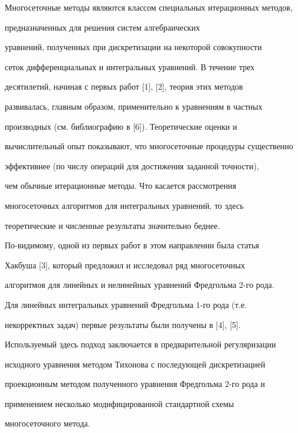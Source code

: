 \maketitle





Многосеточные методы являются классом специальных итерационных методов,


предназначенных для решения систем алгебраических


уравнений, полученных при дискретизации на некоторой совокупности


сеток дифференциальных и интегральных уравнений. В течение трех


десятилетий, начиная с первых работ [1], [2], теория этих методов


развивалась, главным образом, применительно к уравнениям в частных


производных (см. библиографию в [6]). Теоретические оценки и


вычислительный опыт показывают, что многосеточные процедуры существенно


эффективнее (по числу операций для достижения заданной точности),


чем обычные итерационные методы. Что касается рассмотрения


многосеточных алгоритмов для интегральных уравнений, то здесь


теоретические и численные результаты значительно беднее.


По-видимому, одной из первых работ в этом направлении была статья


Хакбуша [3], который предложил и исследовал ряд многосеточных


алгоритмов для линейных и нелинейных уравнений Фредгольма 2-го рода.


Для линейных интегральных уравнений Фредгольма 1-го рода (т.е.


некорректных задач) первые результаты были получены в [4], [5].


Используемый здесь подход заключается в предварительной регуляризации


исходного уравнения методом Тихонова с последующей дискретизацией


проекционным методом полученного уравнения Фредгольма 2-го рода и


применением несколько модифицированной стандартной схемы


многосеточного метода.





